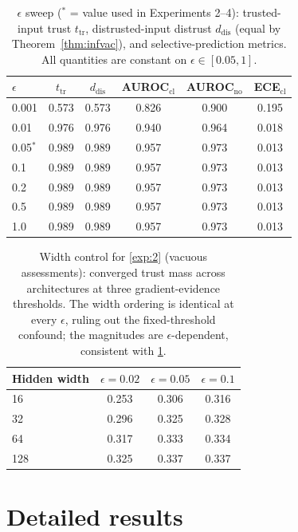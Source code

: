 \begin{table}[H]
\centering\footnotesize
\begin{tabular}{lccccc}
\toprule
$\epsilon$ & $t_{\mathrm{tr}}$ & $d_{\mathrm{dis}}$ & AUROC$_{\mathrm{cl}}$ & AUROC$_{\mathrm{no}}$ & ECE$_{\mathrm{cl}}$ \\
\midrule
0.001 & 0.573 & 0.573 & 0.826 & 0.900 & 0.195 \\
0.01 & 0.976 & 0.976 & 0.940 & 0.964 & 0.018 \\
0.05$^{*}$ & 0.989 & 0.989 & 0.957 & 0.973 & 0.013 \\
0.1 & 0.989 & 0.989 & 0.957 & 0.973 & 0.013 \\
0.2 & 0.989 & 0.989 & 0.957 & 0.973 & 0.013 \\
0.5 & 0.989 & 0.989 & 0.957 & 0.973 & 0.013 \\
1.0 & 0.989 & 0.989 & 0.957 & 0.973 & 0.013 \\
\bottomrule
\end{tabular}
\caption{$\epsilon$ sweep ($^{*}$ = value used in Experiments 2--4): trusted-input trust $t_{\mathrm{tr}}$, distrusted-input distrust $d_{\mathrm{dis}}$ (equal by Theorem~\ref{thm:infvac}), and selective-prediction metrics. All quantities are constant on $\epsilon \in [0.05, 1]$.}
\label{tab:abl-eps}
\end{table}

\begin{table}[H]
\centering\footnotesize
\begin{tabular}{lccc}
\toprule
Hidden width & $\epsilon=0.02$ & $\epsilon=0.05$ & $\epsilon=0.1$ \\
\midrule
16 & 0.253 & 0.306 & 0.316 \\
32 & 0.296 & 0.325 & 0.328 \\
64 & 0.317 & 0.333 & 0.334 \\
128 & 0.325 & 0.337 & 0.337 \\
\bottomrule
\end{tabular}
\caption{Width control for \cref{exp:2} (vacuous assessments): converged trust mass across architectures at three gradient-evidence thresholds. The width ordering is identical at every $\epsilon$, ruling out the fixed-threshold confound; the magnitudes are $\epsilon$-dependent, consistent with \cref{tab:abl-eps}.}
\label{tab:abl-width}
\end{table}

\section{Detailed results}\label{app:expres}

